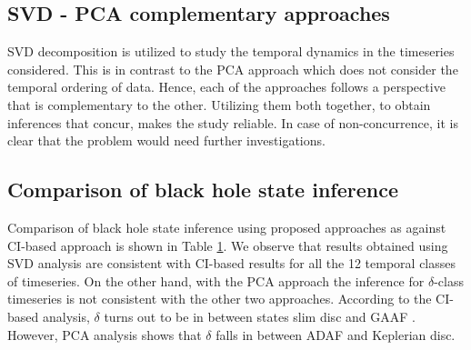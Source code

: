 \documentclass[journal]{IEEEtran}
\begin{document}
\begin{table}[t]
\begin{center}
\begin{tabular}{|p{0.5cm}|p{0.5cm}|p{0.5cm}|p{0.75cm}|p{0.75cm}|p{0.75cm}|p{0.75cm}|p{1cm}|p{0.5cm}|p{1.25cm}|p{1.25cm}|p{1.25cm}|p{0.75cm}|}
			\end{tabular}
			\label{tab:results_1}
		\end{center}
	\end{table}
	\subsection {SVD - PCA complementary approaches} SVD decomposition is utilized to study the temporal dynamics in the timeseries considered. This is in contrast to the PCA approach which does not consider the temporal ordering of data. Hence, each of the approaches follows a perspective that is complementary to the other. Utilizing them both together, to obtain inferences that concur, makes the study reliable. In case of non-concurrence, it is clear that the problem would need further investigations.

\subsection{Comparison of black hole state inference}
Comparison of black hole state inference using proposed approaches as against CI-based approach \cite{Adegoke2018} is shown in Table \ref{tab:results_1}. We observe that results obtained using SVD analysis are consistent with CI-based results for all the 12 temporal classes of timeseries. On the other hand, with the PCA approach the inference for  $\delta$-class timeseries is not consistent with the other two approaches. According to the CI-based analysis, $\delta$ turns out to be in between states slim disc and GAAF \cite{Adegoke2018}. However, PCA analysis shows that $\delta$ falls in between ADAF and Keplerian disc.
	
\end{document}
